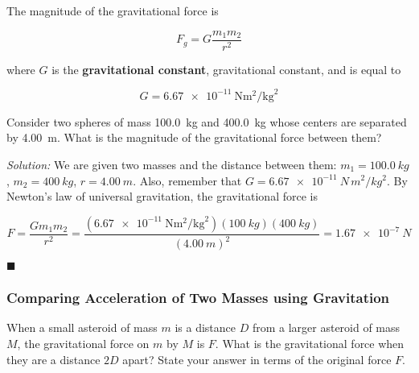\documentclass[dvipsnames]{article}
\begin{document}
The magnitude of the gravitational force is

\begin{equation*}
    F_g  = G\frac{m_1 m_2}{r^2}
\end{equation*}

where $G$ is the \textbf{\gls{gravitational constant}}, \glsdesc{gravitational constant}, and is equal to

\begin{equation*}
    G = \SI[per-mode=fraction]{6.67e-11}{\newton\meter\tothe{2}\per\kilogram\tothe{2}}
\end{equation*}

\begin{example}
Consider two spheres of mass \SI{100.0}{kg} and \SI{400.0}{kg} whose centers are separated by \SI{4.00}{m}. What is the magnitude of the gravitational force between them?
\end{example}

\textit{Solution:}
We are given two masses and the distance between them: $m_1 = \SI{100.0}{kg}$, $m_2 = \SI{400}{kg}$, $r = \SI{4.00}{m}$. Also, remember that $G = \SI{6.67e-11}{N\,m^2/kg^2}$. By Newton's law of universal gravitation, the gravitational force is

\begin{equation*}
    F = \frac{G m_1 m_2}{r^2} = 
    \frac{\left(\SI[per-mode=fraction]{6.67e-11}{\newton\meter\tothe{2}\per\kilogram\tothe{2}}\right) (\SI{100}{kg}) (\SI{400}{kg})}{\left(\SI{4.00}{m}\right)^2} = 
    \boxed{\SI{1.67e-7}{N}}
\end{equation*}

\hfill $\blacksquare$



\subsubsection{Comparing Acceleration of Two Masses using Gravitation}

\begin{example}
When a small asteroid of mass $m$ is a distance $D$ from a larger asteroid of mass $M$, the gravitational force on $m$ by $M$ is $F$. What is the gravitational force when they are a distance $2D$ apart? State your answer in terms of the original force $F$.

\begin{center}
\hspace{1.5cm}
\end{center}
\end{example}
\end{document}
